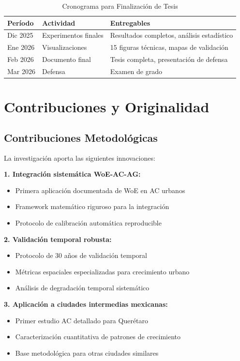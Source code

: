 \documentclass[12pt,letterpaper]{article}
\begin{document}
\begin{table}[H]
\centering
\caption{Cronograma para Finalización de Tesis}
\begin{tabular}{p{3cm}p{4cm}p{7cm}}
\toprule
\textbf{Período} & \textbf{Actividad} & \textbf{Entregables} \\
\midrule
Dic 2025 & Experimentos finales & Resultados completos, análisis estadístico \\
Ene 2026 & Visualizaciones & 15 figuras técnicas, mapas de validación \\
Feb 2026 & Documento final & Tesis completa, presentación de defensa \\
Mar 2026 & Defensa & Examen de grado \\
\bottomrule
\end{tabular}
\end{table}

\section{Contribuciones y Originalidad}

\subsection{Contribuciones Metodológicas}

La investigación aporta las siguientes innovaciones:

\textbf{1. Integración sistemática WoE-AC-AG:}
\begin{itemize}
\item Primera aplicación documentada de WoE en AC urbanos
\item Framework matemático riguroso para la integración
\item Protocolo de calibración automática reproducible
\end{itemize}

\textbf{2. Validación temporal robusta:}
\begin{itemize}
\item Protocolo de 30 años de validación temporal
\item Métricas espaciales especializadas para crecimiento urbano
\item Análisis de degradación temporal sistemático
\end{itemize}

\textbf{3. Aplicación a ciudades intermedias mexicanas:}
\begin{itemize}
\item Primer estudio AC detallado para Querétaro
\item Caracterización cuantitativa de patrones de crecimiento
\item Base metodológica para otras ciudades similares
\end{itemize}
\end{document}

